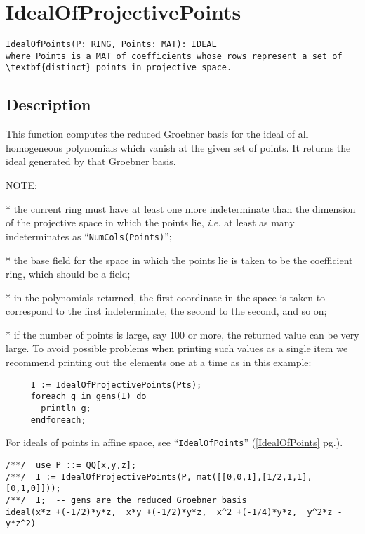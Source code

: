\documentclass[a4paper]{mybook}
\newenvironment{command}{}{} %
\begin{document}
\section{IdealOfProjectivePoints}
\label{IdealOfProjectivePoints}
\begin{command} %


\begin{Verbatim}[label=syntax, rulecolor=\color{MidnightBlue},
frame=single]
IdealOfPoints(P: RING, Points: MAT): IDEAL
where Points is a MAT of coefficients whose rows represent a set of
\textbf{distinct} points in projective space.
\end{Verbatim}


\subsection*{Description}

This function computes the reduced Groebner basis for the ideal of
all homogeneous polynomials which vanish at the given set of points.
It returns the ideal generated by that Groebner basis.
\par 
NOTE:
\par 
 * the current ring must have at least one more indeterminate than the
   dimension of the projective space in which the points lie, \textit{i.e.} at
   least as many indeterminates as ``\verb&NumCols(Points)&'';
\par 
 * the base field for the space in which the points lie is taken to be
   the coefficient ring, which should be a field;
\par 
 * in the polynomials returned, the first coordinate in the space is
   taken to correspond to the first indeterminate, the second to the
   second, and so on;
\par 
 * if the number of points is large, say 100 or more, the returned
   value can be very large.  To avoid possible problems when printing
   such values as a single item we recommend printing out the elements
   one at a time as in this example:
\begin{verbatim}
     I := IdealOfProjectivePoints(Pts);
     foreach g in gens(I) do
       println g;
     endforeach;
\end{verbatim}
For ideals of points in affine space, see ``\verb&IdealOfPoints&'' (\ref{IdealOfPoints} pg.\pageref{IdealOfPoints}).
\begin{Verbatim}[label=example, rulecolor=\color{PineGreen}, frame=single]
/**/  use P ::= QQ[x,y,z];
/**/  I := IdealOfProjectivePoints(P, mat([[0,0,1],[1/2,1,1],[0,1,0]]));
/**/  I;  -- gens are the reduced Groebner basis
ideal(x*z +(-1/2)*y*z,  x*y +(-1/2)*y*z,  x^2 +(-1/4)*y*z,  y^2*z -y*z^2)
\end{Verbatim}



\end{command}
\end{document}
